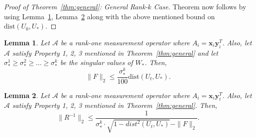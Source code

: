 \documentclass[11pt]{article}
\newtheorem{lemma}{Lemma}
\newcommand{\mvec}{\mathrm{vec}}
\newcommand{\tp}[1]{{#1}^{T}}
\newcommand{\wh}[1]{\widehat{#1}}
\newcommand{\dist}{\mathrm{dist}}
\newcommand{\calA}{\mathcal{A}}
\renewcommand{\v}{\bm{v}}
\newcommand{\Vh}{\widehat{V}}
\newcommand{\Vo}{V_*}
\newcommand{\Vot}{\tp{V}_*}
\newcommand{\So}{\Sigma_*}
\newcommand{\Uo}{U_*}
\newcommand{\so}{\sigma_*}
\newcommand{\vh}{\wh{\v}}
\newcommand{\vo}{\v_* }
\newcommand{\Wo}{W_*}
\newcommand{\x}{\bm{x}}
\newcommand{\y}{\bm{y}}
\newcommand{\xit}{\tp{\x}_i}
\newcommand{\yi}{\y_i}
\begin{document}
\begin{proof}[Proof of Theorem~\ref{thm:general}: General Rank-$k$ Case]
Theorem now follows by using Lemma~\ref{lem:F}, Lemma~\ref{lem:R} along with the above mentioned bound on $\dist(U_0, \Uo)$. %



\end{proof}
\begin{lemma}
  \label{lem:F}
  Let $\calA$ be a rank-one measurement operator where $A_i=\x_i\tp{\y}_i$. Also, let $\calA$ satisfy Property 1, 2, 3 mentioned in Theorem~\ref{thm:general} and let $\so^1\geq \so^2\geq \dots \geq\so^k$ be the singular values of $\Wo$. Then, $$\|F\|_2\leq \frac{\so^k}{100}\dist(U_t, \Uo). $$%
\end{lemma}

\begin{lemma}
  \label{lem:R}
  Let $\calA$ be a rank-one measurement operator where $A_i=\x_i\tp{\y}_i$. Also, let $\calA$ satisfy Property 1, 2, 3 mentioned in Theorem~\ref{thm:general}. Then, $$\|R^{-1}\|_2\leq\frac{1}{ \so^k\cdot \sqrt{1-dist^2(U_t, \Uo)}-\|F\|_2}.$$ 
\end{lemma}
\end{document}
